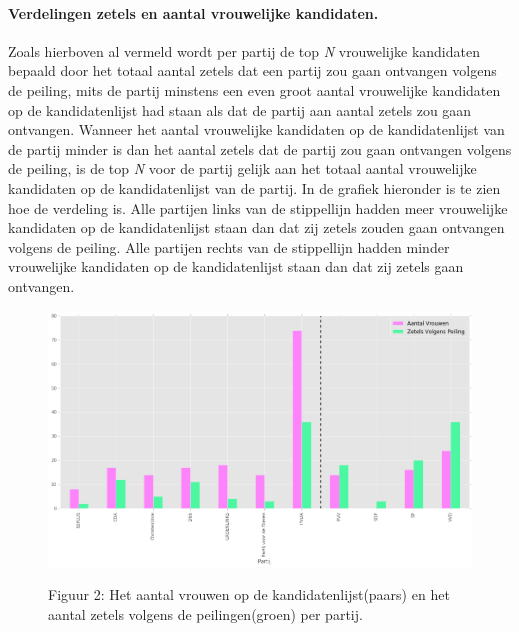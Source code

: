 \paragraph{Verdelingen zetels en aantal vrouwelijke kandidaten.}
Zoals hierboven al vermeld wordt per partij de top \textit{N} vrouwelijke kandidaten bepaald door het totaal aantal zetels dat een partij zou gaan ontvangen volgens de peiling, mits de partij minstens een even groot aantal vrouwelijke kandidaten op de kandidatenlijst had staan als dat de partij aan aantal zetels zou gaan ontvangen. Wanneer het aantal vrouwelijke kandidaten op de kandidatenlijst van de partij minder is dan het aantal zetels dat de partij  zou gaan ontvangen volgens de peiling, is de top \textit{N} voor de partij gelijk aan het totaal aantal vrouwelijke kandidaten op de kandidatenlijst van de partij. 
In de grafiek hieronder is te zien hoe de verdeling is. Alle partijen links van de stippellijn hadden meer vrouwelijke kandidaten op de kandidatenlijst staan dan dat zij zetels zouden gaan ontvangen volgens de peiling. Alle partijen rechts van de stippellijn hadden minder vrouwelijke kandidaten op de kandidatenlijst staan dan dat zij zetels gaan ontvangen.
 
\begin{figure}[H]
\begin{center}
	\includegraphics[width=\linewidth]	{Aantal_vrouwen_aantal_zetels.png}
		\begin{center}
			Figuur 2: Het aantal vrouwen op de kandidatenlijst(paars) en het aantal zetels volgens de peilingen(groen) per partij.
		\end{center}
\end{center}
\end{figure}

